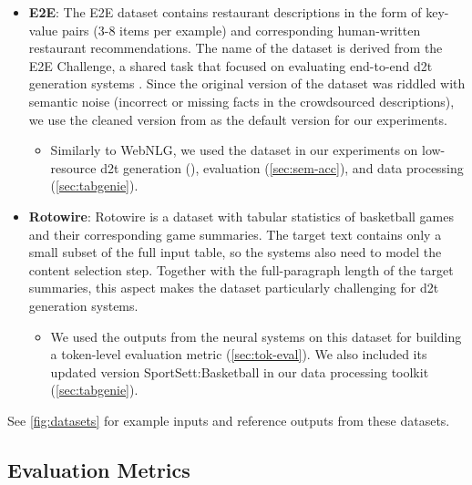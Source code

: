 {\begin{itemize}
    \item \textbf{E2E}: The E2E dataset \cite{dusekEvaluatingStateoftheartEndtoEnd2020,dusekSemanticNoiseMatters2019} contains restaurant descriptions in the form of key-value pairs (3-8 items per example) and corresponding human-written restaurant recommendations. The name of the dataset is derived from the E2E Challenge, a shared task that focused on evaluating end-to-end \ac{d2t} generation systems \cite{dusekEvaluatingStateoftheartEndtoEnd2020}. Since the original version of the dataset was riddled with semantic noise (incorrect or missing facts in the crowdsourced descriptions), we use the cleaned version from \citet{dusekSemanticNoiseMatters2019} as the default version for our experiments.
          \begin{itemize}
              \item
                    Similarly to WebNLG, we used the dataset in our experiments on low-resource \ac{d2t} generation (), evaluation (\autoref{sec:sem-acc}), and data processing (\autoref{sec:tabgenie}).
          \end{itemize}

    \item \textbf{Rotowire}: Rotowire \cite{wiseman2017challenges} is a dataset with tabular statistics of basketball games and their corresponding game summaries. The target text contains only a small subset of the full input table, so the systems also need to model the content selection step. Together with the full-paragraph length of the target summaries, this aspect makes the dataset particularly challenging for \ac{d2t} generation systems.
          \begin{itemize}
              \item
                    We used the outputs from the neural systems on this dataset for building a token-level evaluation metric (\autoref{sec:tok-eval}). We also included its updated version SportSett:Basketball \cite{thomson2020sportsett} in our data processing toolkit (\autoref{sec:tabgenie}).
          \end{itemize}
\end{itemize}

See \autoref{fig:datasets} for example inputs and reference outputs from these datasets.

\subsection{Evaluation Metrics}
\label{sec:evaluation}

}
